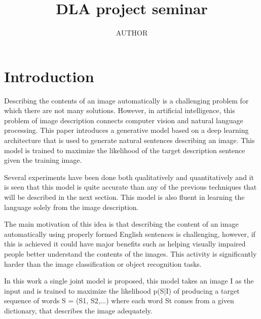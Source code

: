 \documentclass[a4paper,UKenglish,cleveref, autoref, thm-restate]{lipics-v2021}
\title{DLA project seminar } %
\author{AUTHOR}{Ulm University, Germany}{email@uni-ulm.de}{}{}%
\begin{document}
\maketitle



\section{ Introduction}
\label{introduction}

Describing the contents of an image automatically is a challenging problem for which there are not many solutions. However, in artificial intelligence, this problem of image description connects computer vision and natural language processing. This paper introduces a generative model based on a deep learning architecture that is used to generate natural sentences describing an image.
This model is trained to maximize the likelihood of the target description sentence given the training image.

Several experiments have been done both qualitatively and quantitatively and it is seen that this model is quite accurate than any of the previous techniques that will be described in the next section. This model is also fluent in learning the language solely from the image description.

The main motivation of this idea is that describing the content of an image automatically using properly formed English sentences is challenging, however, if this is achieved it could have major benefits such as helping visually impaired people better understand the contents of the images.
This activity is significantly harder than the image classification or object recognition tasks.

In this work a single joint model is proposed, this model takes an image I as the input and is trained to maximize the likelihood p(S|I) of producing a target sequence of words S = (S1, S2,...) where each word St comes from a given dictionary, that describes the image adequately.
\end{document}
